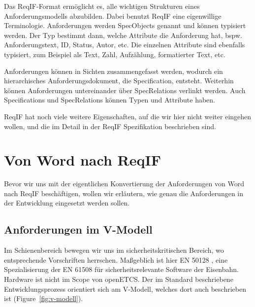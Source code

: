 \documentclass[twoside]{article}
\begin{document}
\begin{multicols}{2}
Das ReqIF-Format ermöglicht es, alle wichtigen Strukturen eines Anforderungsmodells abzubilden.  Dabei benutzt ReqIF eine eigenwillige Terminologie.  Anforderungen werden SpecObjects genannt und können typisiert werden.  Der Typ bestimmt dann, welche Attribute die Anforderung hat, bspw. Anforderungstext, ID, Status, Autor, etc. Die einzelnen Attribute sind ebenfalls typisiert, zum Beispiel als Text, Zahl, Aufzählung, formatierter Text, etc.

Anforderungen können in Sichten zusammengefasst werden, wodurch ein hierarchisches Anforderungsdokument, die Specification, entsteht.  Weiterhin können Anforderungen untereinander über SpecRelations verlinkt werden. Auch Specifications und SpecRelations können Typen und Attribute haben.

ReqIF hat noch viele weitere Eigenschaften, auf die wir hier nicht weiter eingehen wollen, und die im Detail in der ReqIF Spezifikation \cite{reqif} beschrieben sind.

\section{Von Word nach ReqIF}

Bevor wir uns mit der eigentlichen Konvertierung der Anforderungen von Word nach ReqIF beschäftigen, wollen wir erläutern, wie genau die Anforderungen in der Entwicklung eingesetzt werden sollen.

\subsection{Anforderungen im V-Modell}

Im Schienenbereich bewegen wir uns im sicherheitskritischen Bereich, wo entsprechende Vorschriften herrschen.  Maßgeblich ist hier EN 50128 \cite{en50128}, eine Spezialisierung der EN 61508 für sicherheitsrelevante Software der Eisenbahn.  Hardware ist nicht im Scope von openETCS.  Der im Standard beschriebene Entwicklungsprozess orientiert sich am V-Modell, welches dort auch beschrieben ist (Figure~\ref{fig:v-modell}). 


\end{multicols}
\end{document}
